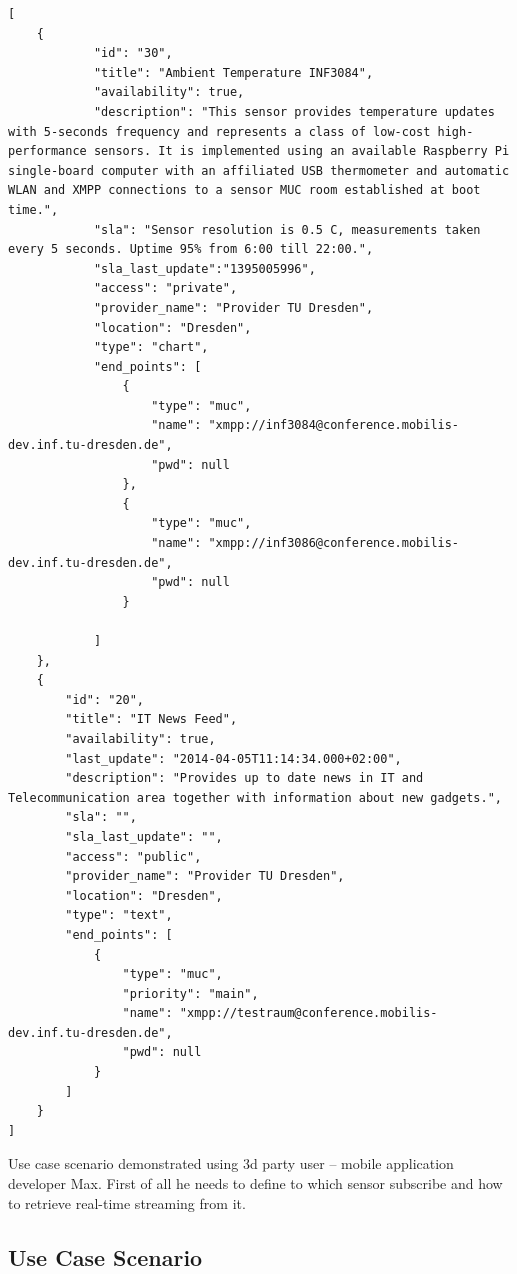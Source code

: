 	\begin{lstlisting}[label=sensor_registry,caption=JSON Description Format]
[
    {
            "id": "30",
            "title": "Ambient Temperature INF3084",
            "availability": true,
            "description": "This sensor provides temperature updates with 5-seconds frequency and represents a class of low-cost high-performance sensors. It is implemented using an available Raspberry Pi single-board computer with an affiliated USB thermometer and automatic WLAN and XMPP connections to a sensor MUC room established at boot time.",
            "sla": "Sensor resolution is 0.5 C, measurements taken every 5 seconds. Uptime 95% from 6:00 till 22:00.",
            "sla_last_update":"1395005996",
            "access": "private",
            "provider_name": "Provider TU Dresden",
            "location": "Dresden",            
            "type": "chart",
            "end_points": [
                {
                    "type": "muc",
                    "name": "xmpp://inf3084@conference.mobilis-dev.inf.tu-dresden.de",
                    "pwd": null
                },
                {
                    "type": "muc",
                    "name": "xmpp://inf3086@conference.mobilis-dev.inf.tu-dresden.de",
                    "pwd": null
                }

            ]
    },
    {
        "id": "20",
        "title": "IT News Feed",
        "availability": true,
        "last_update": "2014-04-05T11:14:34.000+02:00",
        "description": "Provides up to date news in IT and Telecommunication area together with information about new gadgets.",
        "sla": "",
        "sla_last_update": "",
        "access": "public",
        "provider_name": "Provider TU Dresden",
        "location": "Dresden",
        "type": "text",
        "end_points": [
            {
                "type": "muc",
                "priority": "main",
                "name": "xmpp://testraum@conference.mobilis-dev.inf.tu-dresden.de",
                "pwd": null
            }
        ]        
    }
]
	\end{lstlisting}
Use case scenario demonstrated using 3d party user -- mobile application developer Max. First of all he needs to define to which sensor subscribe and how to retrieve real-time streaming from it. 
\subsection{Use Case Scenario}
\label{section:use-case-scenario}

